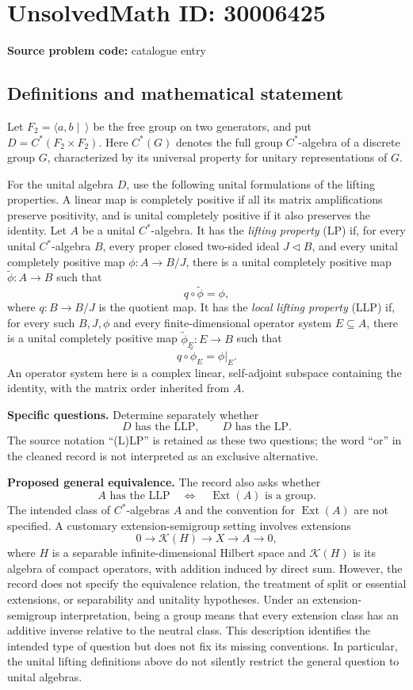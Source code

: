 \documentclass[11pt]{article}
\begin{document}
\section*{UnsolvedMath ID: 30006425}
\textbf{Source problem code:} catalogue entry
\subsection{Definitions and mathematical statement}
Let \(F_2=\langle a,b\mid\ \rangle\) be the free group on two generators, and put \(D=C^*(F_2\times F_2)\). Here \(C^*(G)\) denotes the full group \(C^*\)-algebra of a discrete group \(G\), characterized by its universal property for unitary representations of \(G\).

For the unital algebra \(D\), use the following unital formulations of the lifting properties. A linear map is completely positive if all its matrix amplifications preserve positivity, and is unital completely positive if it also preserves the identity. Let \(A\) be a unital \(C^*\)-algebra. It has the \emph{lifting property} (LP) if, for every unital \(C^*\)-algebra \(B\), every proper closed two-sided ideal \(J\triangleleft B\), and every unital completely positive map \(\phi:A\to B/J\), there is a unital completely positive map \(\widetilde\phi:A\to B\) such that
\[
q\circ\widetilde\phi=\phi,
\]
where \(q:B\to B/J\) is the quotient map. It has the \emph{local lifting property} (LLP) if, for every such \(B,J,\phi\) and every finite-dimensional operator system \(E\subseteq A\), there is a unital completely positive map \(\widetilde\phi_E:E\to B\) such that
\[
q\circ\widetilde\phi_E=\phi|_E.
\]
An operator system here is a complex linear, self-adjoint subspace containing the identity, with the matrix order inherited from \(A\).

\textbf{Specific questions.} Determine separately whether
\[
D\text{ has the LLP},\qquad D\text{ has the LP}.
\]
The source notation ``(L)LP'' is retained as these two questions; the word ``or'' in the cleaned record is not interpreted as an exclusive alternative.

\textbf{Proposed general equivalence.} The record also asks whether
\[
A\text{ has the LLP}\quad\Longleftrightarrow\quad
\operatorname{Ext}(A)\text{ is a group}.
\]
The intended class of \(C^*\)-algebras \(A\) and the convention for \(\operatorname{Ext}(A)\) are not specified. A customary extension-semigroup setting involves extensions
\[
0\longrightarrow\mathcal K(H)\longrightarrow X\longrightarrow A\longrightarrow0,
\]
where \(H\) is a separable infinite-dimensional Hilbert space and \(\mathcal K(H)\) is its algebra of compact operators, with addition induced by direct sum. However, the record does not specify the equivalence relation, the treatment of split or essential extensions, or separability and unitality hypotheses. Under an extension-semigroup interpretation, being a group means that every extension class has an additive inverse relative to the neutral class. This description identifies the intended type of question but does not fix its missing conventions. In particular, the unital lifting definitions above do not silently restrict the general question to unital algebras.
\end{document}
